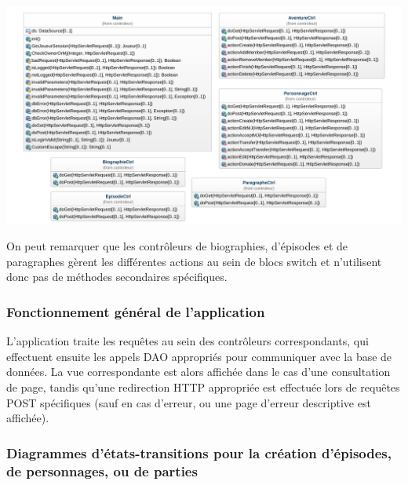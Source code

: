 \documentclass[a4paper, 11pt, titlepage]{article}
\begin{document}
\begin{center}
\includegraphics[scale=0.55]{conception/ctrl.pdf}
\end{center}

On peut remarquer que les contrôleurs de biographies, d'épisodes et de paragraphes gèrent les différentes actions au sein de blocs switch et n'utilisent donc pas de méthodes secondaires spécifiques.


\subsubsection {Fonctionnement général de l'application}

L'application traite les requêtes au sein des contrôleurs correspondants, qui effectuent ensuite les appels DAO appropriés pour communiquer avec la base de données. La vue correspondante est alors affichée dans le cas d'une consultation de page, tandis qu'une redirection HTTP appropriée est effectuée lors de requêtes POST spécifiques (sauf en cas d'erreur, ou une page d'erreur descriptive est affichée).


\subsubsection {Diagrammes d'états-transitions pour la création d'épisodes, de personnages, ou de parties}
\end{document}
